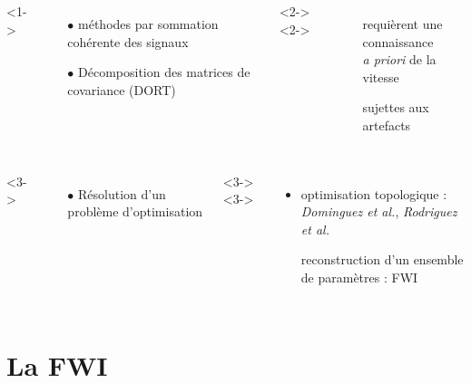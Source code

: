 \documentclass[10pt,xcolor=x11names,compress, notes=show]{beamer}%
\begin{document}
\begin{frame}{\insertsectionhead}
\begin{columns}[c]
	\end{columns}
	\vspace{0.3cm}
	\begin{columns}[c]
			<1->
				\begin{itemize}
					\item[$\bullet$] méthodes par sommation cohérente des signaux
					\item[$\bullet$] Décomposition des matrices de covariance (DORT)
				\end{itemize}
			<2->
			<2->
				\begin{itemize}
					\item[\ding{55}] requièrent une connaissance\\ \emph{a priori} de la vitesse\\
					\item[\ding{55}] sujettes aux artefacts
				\end{itemize}
	\end{columns}
	\begin{columns}[c]
		<3->
			\begin{itemize}
				\item[$\bullet$] Résolution d'un problème d'optimisation
			\end{itemize}
		<3->
		<3->
			\begin{itemize}
			\item optimisation topologique :\\\hspace{-0.5cm}\small{\emph{Dominguez et al.}, \emph{Rodriguez et al.}}\\[0.1cm]
			\item[\ding{51}] \normalsize{reconstruction d'un ensemble de paramètres : FWI}
		\end{itemize}		
	\end{columns}
\end{frame} 


\section{La FWI}
\end{document}
